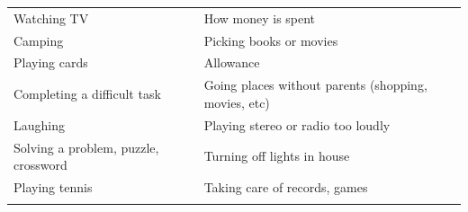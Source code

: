 \documentclass[
]{book}
\begin{document}
\begin{longtable}[]{@{}ll@{}}
\begin{minipage}[t]{0.50\columnwidth}\raggedright
Watching TV\strut
\end{minipage} & \begin{minipage}[t]{0.44\columnwidth}\raggedright
How money is spent\strut
\end{minipage}\tabularnewline
\begin{minipage}[t]{0.50\columnwidth}\raggedright
Camping\strut
\end{minipage} & \begin{minipage}[t]{0.44\columnwidth}\raggedright
Picking books or movies\strut
\end{minipage}\tabularnewline
\begin{minipage}[t]{0.50\columnwidth}\raggedright
Playing cards\strut
\end{minipage} & \begin{minipage}[t]{0.44\columnwidth}\raggedright
Allowance\strut
\end{minipage}\tabularnewline
\begin{minipage}[t]{0.50\columnwidth}\raggedright
Completing a difficult task\strut
\end{minipage} & \begin{minipage}[t]{0.44\columnwidth}\raggedright
Going places without parents (shopping, movies, etc)\strut
\end{minipage}\tabularnewline
\begin{minipage}[t]{0.50\columnwidth}\raggedright
Laughing\strut
\end{minipage} & \begin{minipage}[t]{0.44\columnwidth}\raggedright
Playing stereo or radio too loudly\strut
\end{minipage}\tabularnewline
\begin{minipage}[t]{0.50\columnwidth}\raggedright
Solving a problem, puzzle, crossword\strut
\end{minipage} & \begin{minipage}[t]{0.44\columnwidth}\raggedright
Turning off lights in house\strut
\end{minipage}\tabularnewline
\begin{minipage}[t]{0.50\columnwidth}\raggedright
Playing tennis\strut
\end{minipage} & \begin{minipage}[t]{0.44\columnwidth}\raggedright
Taking care of records, games\strut
\end{minipage}\tabularnewline
\begin{minipage}[t]{0.50\columnwidth}\raggedright

\end{minipage}
\end{longtable}
\end{document}
